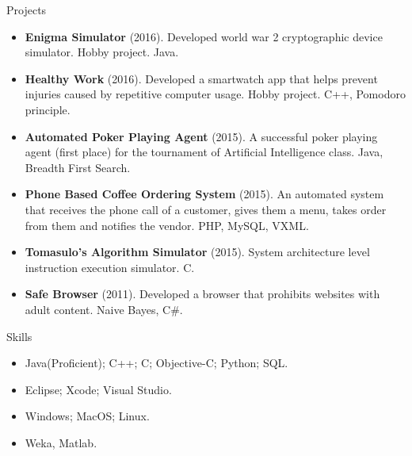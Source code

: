 \documentclass[]{mcdowellcv}
\begin{document}
	
	\begin{cvsection}{Projects}
		\begin{cvsubsection}{}{}{}
			\begin{itemize}
			\item \textbf{Enigma Simulator} (2016).  Developed world war 2 cryptographic device simulator. Hobby project.  Java.
				\item \textbf{Healthy Work} (2016). Developed a smartwatch app that helps prevent injuries caused by repetitive computer usage. Hobby project. C++, Pomodoro principle.				
				\item \textbf{Automated Poker Playing Agent} (2015). A successful poker playing agent (first place) for the tournament of Artificial Intelligence class. Java, Breadth First Search.
				\item \textbf{Phone Based Coffee Ordering System} (2015). An automated system that receives the phone call of a customer, gives them a menu, takes order from them and notifies the vendor.  PHP, MySQL, VXML.
				\item \textbf{Tomasulo’s Algorithm Simulator} (2015). System architecture level instruction execution simulator. C.
\item \textbf{Safe Browser} (2011). Developed a browser that prohibits websites with adult content. Naive Bayes, C\#.
			\end{itemize}
		\end{cvsubsection}
	\end{cvsection}
	
	
	\begin{cvsection}{Skills}
		\begin{cvsubsection}{}{}{}	
			\begin{itemize}
				\item Java(Proficient); C++; C; Objective-C; Python; SQL.  
				\item Eclipse; Xcode; Visual Studio.
				\item Windows; MacOS; Linux. 
				\item Weka, Matlab.
			\end{itemize}
		\end{cvsubsection}
	\end{cvsection}
	
\end{document}
